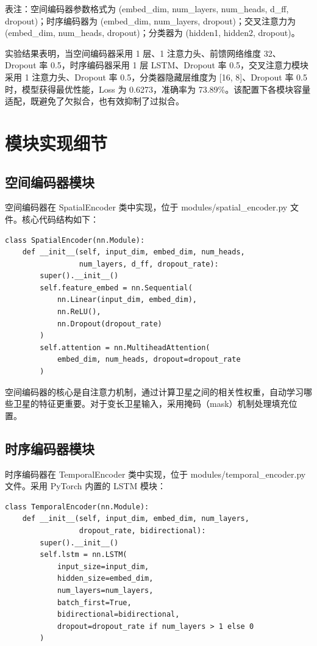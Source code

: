 表注：空间编码器参数格式为 (embed\_dim, num\_layers, num\_heads, d\_ff, dropout)；时序编码器为 (embed\_dim, num\_layers, dropout)；交叉注意力为 (embed\_dim, num\_heads, dropout)；分类器为 (hidden1, hidden2, dropout)。

实验结果表明，当空间编码器采用 1 层、1 注意力头、前馈网络维度 32、Dropout 率 0.5，时序编码器采用 1 层 LSTM、Dropout 率 0.5，交叉注意力模块采用 1 注意力头、Dropout 率 0.5，分类器隐藏层维度为 [16, 8]、Dropout 率 0.5 时，模型获得最优性能，Loss 为 0.6273，准确率为 73.89\%。该配置下各模块容量适配，既避免了欠拟合，也有效抑制了过拟合。

\section{模块实现细节}

\subsection{空间编码器模块}

空间编码器在 SpatialEncoder 类中实现，位于 modules/spatial\_encoder.py 文件。核心代码结构如下：

\begin{verbatim}
class SpatialEncoder(nn.Module):
    def __init__(self, input_dim, embed_dim, num_heads, 
                 num_layers, d_ff, dropout_rate):
        super().__init__()
        self.feature_embed = nn.Sequential(
            nn.Linear(input_dim, embed_dim),
            nn.ReLU(),
            nn.Dropout(dropout_rate)
        )
        self.attention = nn.MultiheadAttention(
            embed_dim, num_heads, dropout=dropout_rate
        )
\end{verbatim}

空间编码器的核心是自注意力机制，通过计算卫星之间的相关性权重，自动学习哪些卫星的特征更重要。对于变长卫星输入，采用掩码（mask）机制处理填充位置。

\subsection{时序编码器模块}

时序编码器在 TemporalEncoder 类中实现，位于 modules/temporal\_encoder.py 文件。采用 PyTorch 内置的 LSTM 模块：

\begin{verbatim}
class TemporalEncoder(nn.Module):
    def __init__(self, input_dim, embed_dim, num_layers, 
                 dropout_rate, bidirectional):
        super().__init__()
        self.lstm = nn.LSTM(
            input_size=input_dim,
            hidden_size=embed_dim,
            num_layers=num_layers,
            batch_first=True,
            bidirectional=bidirectional,
            dropout=dropout_rate if num_layers > 1 else 0
        )
\end{verbatim}

